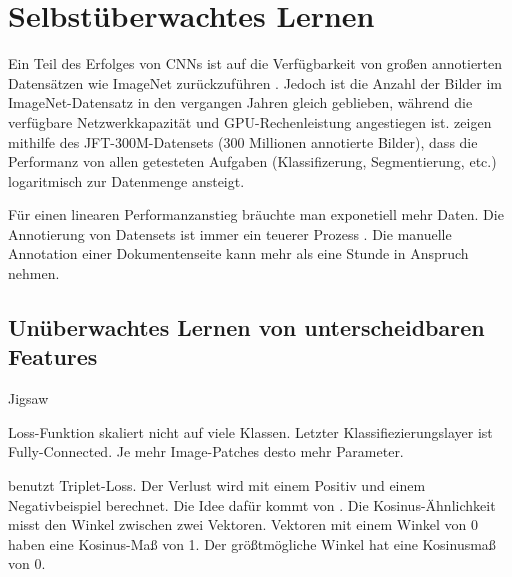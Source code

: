 \chapter{Selbstüberwachtes Lernen}
\label{chap:selfsupervised}
Ein Teil des Erfolges von CNNs ist auf die Verfügbarkeit von großen annotierten Datensätzen wie ImageNet zurückzuführen
\autocite{SunRevisitingUnreasonableEffectiveness2017}.
Jedoch ist die Anzahl der Bilder im ImageNet-Datensatz in den vergangen Jahren gleich geblieben, während die  verfügbare Netzwerkkapazität und GPU-Rechenleistung angestiegen ist.
\citeauthor{SunRevisitingUnreasonableEffectiveness2017} zeigen mithilfe des JFT-300M-Datensets (300 Millionen annotierte Bilder), dass die Performanz von allen getesteten Aufgaben (Klassifizerung, Segmentierung, etc.)
logaritmisch zur Datenmenge ansteigt. 

Für einen linearen Performanzanstieg bräuchte man exponetiell mehr Daten.
Die Annotierung von Datensets ist immer ein teuerer Prozess \autocite[988]{ValvenyDatasetsAnnotationsDocument2014}.
Die manuelle Annotation einer Dokumentenseite kann mehr als eine Stunde in Anspruch nehmen. 





\vspace{0.5cm}



\section{Unüberwachtes Lernen von unterscheidbaren Features}


Jigsaw
\cite{NorooziUnsupervisedLearningVisual2016}

\cite{DosovitskiyDiscriminativeUnsupervisedFeature2016} Loss-Funktion skaliert nicht auf viele Klassen.
Letzter Klassifiezierungslayer ist Fully-Connected. Je mehr Image-Patches desto mehr Parameter.

\cite{DoerschMultitaskSelfSupervisedVisual2017} benutzt Triplet-Loss.
Der Verlust wird mit einem Positiv und einem Negativbeispiel berechnet.
Die Idee dafür kommt von \citeauthor{WangUnsupervisedLearningVisual2015}.
Die Kosinus-Ähnlichkeit misst den Winkel zwischen zwei Vektoren. Vektoren mit einem Winkel von 0 haben
eine Kosinus-Maß von 1. Der größtmögliche Winkel hat eine Kosinusmaß von 0.
